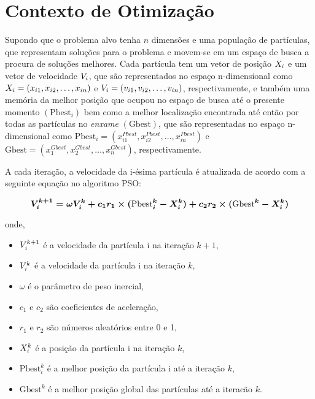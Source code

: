 \documentclass[
	12pt,				%
	openright,			%
	twoside,			%
	a4paper,			%
	english,			%
	french,				%
	spanish,			%
	brazil				%
	]{abntex2}
\begin{document}
\section{Contexto de Otimização}
Supondo que o problema alvo tenha $n$ dimensões e uma população de partículas, que representam soluções para o problema e movem-se em um espaço de busca a procura de soluções melhores. Cada partícula tem um vetor de posição $\boldmath{X}_i$ e um vetor de velocidade $\boldmath{V}_i$, que são representados no espaço n-dimensional como $\boldmath{X}_i = (x_{i1}, x_{i2}, \dots, x_{in})$ e  $\boldmath{V}_i = (v_{i1}, v_{i2}, \dots, v_{in})$, respectivamente, e também uma memória da melhor posição que ocupou no espaço de busca até o presente momento $(\text{Pbest}_i)$ bem como a melhor localização encontrada até então por todas as partículas no \textit{enxame} $(\text{Gbest})$, que são representadas no espaço n-dimensional como $\text{Pbest}_i = (x_{i1}^{Pbest}, x_{i2}^{Pbest}, \dots, x_{in}^{Pbest})$ e $\text{Gbest} = (x_1^{Gbest}, x_2^{Gbest}, \dots, x_n^{Gbest})$, respectivamente. 

A cada iteração, a velocidade da i-ésima partícula é atualizada de acordo com a seguinte equação no algoritmo PSO:

\begin{equation}
\boldmath{V}_i^{k+1} = \omega\boldmath{V}_i^k + c_1r_1 \times (\text{Pbest}_i^k - \boldmath{X}_i^k) + c_2r_2\times(\text{Gbest}^k - \boldmath{X}_i^k)
\label{eq:PSO1}
\end{equation}

onde,

\begin{itemize}
\item $\boldmath{V}_i^{k+1}$ é a velocidade da partícula i na iteração $k+1$,
\item $\boldmath{V}_i^{k}$ é a velocidade da partícula i na iteração $k$,
\item $\omega$ é o parâmetro de peso inercial,
\item $c_1$ e $c_2$ são coeficientes de aceleração,
\item $r_1$ e $r_2$ são números aleatórios entre 0 e 1,
\item $\boldmath{X}_i^k$ é a posição da partícula i na iteração $k$,
\item $\text{Pbest}_i^k$ é a melhor posição da partícula i até a iteração $k$,
\item $\text{Gbest}^k$ é a melhor posição global das partículas até a iteracão $k$.
\end{itemize}
\end{document}
